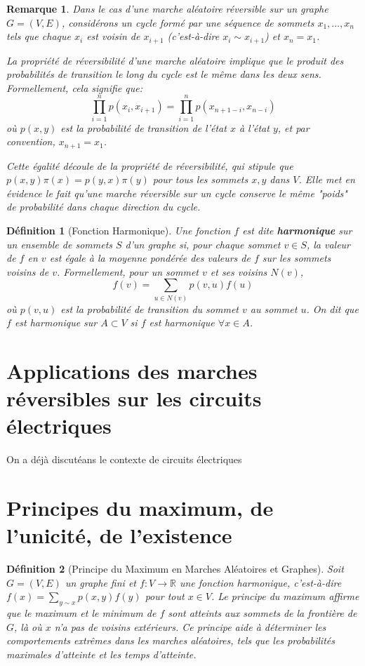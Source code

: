 \documentclass{article}
\theoremstyle{pasdepoint}
\newtheorem{definition}{Définition}
\theoremstyle{break}
\theoremstyle{pasdepoint}
\newtheorem*{remark}{Remarque}
\begin{document}
\begin{remark}
    Dans le cas d'une marche aléatoire réversible sur un graphe \( G = (V, E) \), considérons un cycle formé par une séquence de sommets \( x_1, \ldots, x_n \) tels que chaque \( x_i \) est voisin de \( x_{i+1} \) (c'est-à-dire \( x_i \sim x_{i+1} \)) et \( x_n = x_1 \). 

    La propriété de réversibilité d'une marche aléatoire implique que le produit des probabilités de transition le long du cycle est le même dans les deux sens. Formellement, cela signifie que:
    \[
    \prod_{i=1}^{n}p(x_i, x_{i+1}) = \prod_{i=1}^{n}p(x_{n+1-i}, x_{n-i})
    \]
    où \( p(x, y) \) est la probabilité de transition de l'état \( x \) à l'état \( y \), et par convention, \( x_{n+1} = x_1 \).

    Cette égalité découle de la propriété de réversibilité, qui stipule que \( p(x, y)\pi(x) = p(y, x)\pi(y) \) pour tous les sommets \( x, y \) dans \( V \). Elle met en évidence le fait qu'une marche réversible sur un cycle conserve le même "poids" de probabilité dans chaque direction du cycle.
\end{remark}

\begin{definition}[Fonction Harmonique]
    Une fonction \(f\) est dite \textbf{harmonique} sur un ensemble de sommets \(S\) d'un graphe si, pour chaque sommet \(v \in S\), la valeur de \(f\) en \(v\) est égale à la moyenne pondérée des valeurs de \(f\) sur les sommets voisins de \(v\). Formellement, pour un sommet \(v\) et ses voisins \(N(v)\),
    \[
    f(v) = \sum_{u \in N(v)} p(v, u) f(u)
    \]
    où \(p(v, u)\) est la probabilité de transition du sommet \(v\) au sommet \(u\). On dit que \(f\) est harmonique sur \(A \subset V\) si \(f\) est harmonique \(\forall x \in A\).
\end{definition}

\section{Applications des marches réversibles sur les circuits électriques}

On a déjà discutéans le contexte de circuits électriques

\section*{Principes du maximum, de l'unicité, de l'existence}

\begin{definition}[Principe du Maximum en Marches Aléatoires et Graphes]
    Soit \(G = (V, E)\) un graphe fini et \(f: V \rightarrow \mathbb{R}\) une fonction harmonique, c'est-à-dire \(f(x) = \sum_{y \sim x} p(x, y) f(y)\) pour tout \(x \in V\). Le principe du maximum affirme que le maximum et le minimum de \(f\) sont atteints aux sommets de la frontière de \(G\), là où \(x\) n'a pas de voisins extérieurs. Ce principe aide à déterminer les comportements extrêmes dans les marches aléatoires, tels que les probabilités maximales d'atteinte et les temps d'atteinte.
    \end{definition}
    
\end{document}
